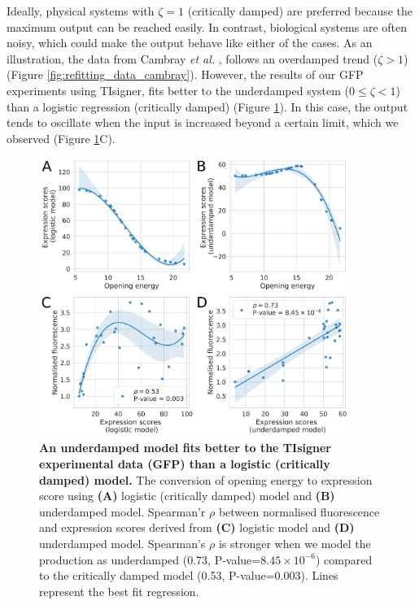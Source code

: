 Ideally, physical systems with $\zeta = 1$ (critically damped) are preferred because the maximum output can be reached easily. In contrast, biological systems are often noisy, which could make the output behave like either of the cases. As an illustration, the data from Cambray \textit{et al.} \cite{Cambray2018-kn}, follows an overdamped trend ($\zeta > 1$) (Figure \ref{fig:refitting_data_cambray}). However, the results of our GFP experiments using TIsigner, fits better to the underdamped system ($0 \leq \zeta < 1 $) than a logistic regression (critically damped) (Figure \ref{fig:refitting_data_tisigner}). In this case, the output tends to oscillate when the input is increased beyond a certain limit, which we observed (Figure \ref{fig:refitting_data_tisigner}C).


\begin{figure}[htbp!]
\center
\includegraphics[width=0.9\textwidth]{chapters/Discussion/Figures/refitting_tisigner.png}
\caption[An underdamped model fits better to the TIsigner experimental data (GFP) than a logistic (critically damped) model.]{\textbf{An underdamped model fits better to the TIsigner experimental data (GFP) than a logistic (critically damped) model.} The conversion of opening energy to expression score using \textbf{(A)} logistic (critically damped) model and  \textbf{(B)} underdamped model. Spearman'r $\rho$ between normalised fluorescence and expression scores derived from \textbf{(C)} logistic model and \textbf{(D)} underdamped model. Spearman's $\rho$ is stronger when we model the production as underdamped (0.73, P-value=$8.45\times 10^{-6}$) compared to the critically damped model (0.53, P-value=0.003). Lines represent the best fit regression.}%
\label{fig:refitting_data_tisigner}
\end{figure}

